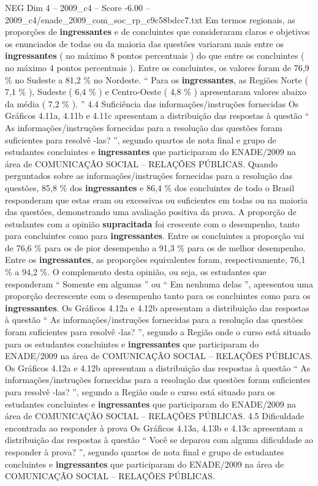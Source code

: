 \begin{textsample}{NEG Dim 4 – 2009\_c4 – Score -6.00 – 2009\_c4/enade\_2009\_com\_soc\_rp\_c9c58bdcc7.txt}
Em termos regionais, as proporções de \textbf{ingressantes} e de concluintes que consideraram claros e objetivos os enunciados de todas ou da maioria das questões variaram mais entre os \textbf{ingressantes} ( no máximo 8 pontos percentuais ) do que entre os concluintes ( no máximo 4 pontos percentuais ).
Entre os concluintes, os valores foram de 76,9 \% no Sudeste a 81,2 \% no Nordeste. “ Para os \textbf{ingressantes}, as Regiões Norte ( 7,1 \% ), Sudeste ( 6,4 \% ) e Centro-Oeste ( 4,8 \% ) apresentaram valores abaixo da média ( 7,2 \% ). ” 4.4 Suficiência das informações/instruções fornecidas Os Gráficos 4.11a, 4.11b e 4.11c apresentam a distribuição das respostas à questão “ As informações/instruções fornecidas para a resolução das questões foram suficientes para resolvê -las? ”, segundo quartos de nota final e grupo de estudantes concluintes e \textbf{ingressantes} que participaram do ENADE/2009 na área de COMUNICAÇÃO SOCIAL – RELAÇÕES PÚBLICAS.
Quando perguntados sobre as informações/instruções fornecidas para a resolução das questões, 85,8 \% dos \textbf{ingressantes} e 86,4 \% dos concluintes de todo o Brasil responderam que estas eram ou excessivas ou suficientes em todas ou na maioria das questões, demonstrando uma avaliação positiva da prova.
A proporção de estudantes com a opinião \textbf{supracitada} foi crescente com o desempenho, tanto para concluintes como para \textbf{ingressantes}.
Entre os concluintes a proporção vai de 76,6 \% para os de pior desempenho a 91,3 \% para os de melhor desempenho.
Entre os \textbf{ingressantes}, as proporções equivalentes foram, respectivamente, 76,1 \% a 94,2 \%.
O complemento desta opinião, ou seja, os estudantes que responderam “ Somente em algumas ” ou “ Em nenhuma delas ”, apresentou uma proporção decrescente com o desempenho tanto para os concluintes como para os \textbf{ingressantes}.
Os Gráficos 4.12a e 4.12b apresentam a distribuição das respostas à questão “ As informações/instruções fornecidas para a resolução das questões foram suficientes para resolvê -las? ”, segundo a Região onde o curso está situado para os estudantes concluintes e \textbf{ingressantes} que participaram do ENADE/2009 na área de COMUNICAÇÃO SOCIAL – RELAÇÕES PÚBLICAS.
Os Gráficos 4.12a e 4.12b apresentam a distribuição das respostas à questão “ As informações/instruções fornecidas para a resolução das questões foram suficientes para resolvê -las? ”, segundo a Região onde o curso está situado para os estudantes concluintes e \textbf{ingressantes} que participaram do ENADE/2009 na área de COMUNICAÇÃO SOCIAL – RELAÇÕES PÚBLICAS. 4.5 Dificuldade encontrada ao responder à prova Os Gráficos 4.13a, 4.13b e 4.13c apresentam a distribuição das respostas à questão “ Você se deparou com alguma dificuldade ao responder à prova? ”, segundo quartos de nota final e grupo de estudantes concluintes e \textbf{ingressantes} que participaram do ENADE/2009 na área de COMUNICAÇÃO SOCIAL – RELAÇÕES PÚBLICAS.

\end{textsample}
